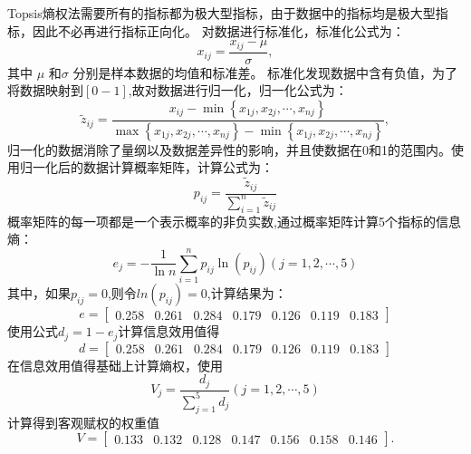 \documentclass[withoutpreface,bwprint]{cumcmthesis} %
\begin{document}
Topsis熵权法需要所有的指标都为极大型指标，由于数据中的指标均是极大型指标，因此不必再进行指标正向化。 对数据进行标准化，标准化公式为：$$x_{ij} = \frac {x_{ij}-\mu}{\sigma},$$其中 $ \mu $ 和$ \sigma $ 分别是样本数据的均值和标准差。
标准化发现数据中含有负值，为了将数据映射到$[0-1]$,故对数据进行归一化，归一化公式为：$$\tilde{z}_{i j}=\frac{x_{i j}-\min \left\{x_{1 j}, x_{2 j}, \cdots, x_{n j}\right\}}{\max \left\{x_{1 j}, x_{2 j}, \cdots, x_{n j}\right\}-\min \left\{x_{1 j}, x_{2 j}, \cdots, x_{n j}\right\}},$$
归一化的数据消除了量纲以及数据差异性的影响，并且使数据在0和1的范围内。使用归一化后的数据计算概率矩阵，计算公式为：$$p_{i j}=\frac{\tilde{z}_{i j}}{\sum_{i=1}^{n} \tilde{z}_{i j}}$$
概率矩阵的每一项都是一个表示概率的非负实数,通过概率矩阵计算5个指标的信息熵：$$e_{j}=-\frac{1}{\ln n} \sum_{i=1}^{n} p_{i j} \ln \left(p_{i j}\right)(j=1,2, \cdots, 5)$$其中，如果$p_{ij}=0$,则令$ln(p_{ij})=0$,计算结果为：$$e=\left[\begin{array}{lllllll}
0.258 & 0.261 & 0.284 & 0.179 & 0.126 & 0.119 & 0.183
\end{array}\right]
$$
使用公式$d_j=1-e_j$计算信息效用值得$$d=\left[\begin{array}{lllllll}
0.258 & 0.261 & 0.284 & 0.179 & 0.126 & 0.119 & 0.183
\end{array}\right]
$$
在信息效用值得基础上计算熵权，使用
$$V_{j}=
\frac{d_{j}} { \sum_{j=1}^{5} d_{j}}(j=1,2, \cdots, 5)$$计算得到客观赋权的权重值$$V=\left[\begin{array}{lllllll}
0.133 & 0.132 & 0.128 & 0.147 & 0.156 & 0.158 & 0.146
\end{array}\right].$$
\end{document}
